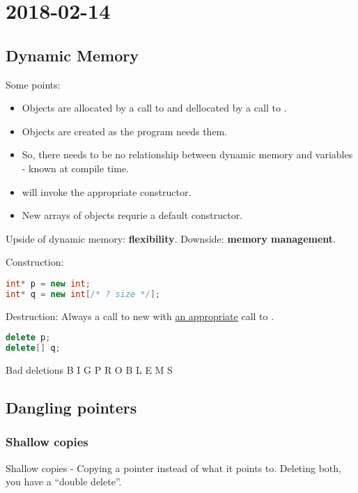 \section{2018-02-14}

\subsection{Dynamic Memory}

Some points:

\begin{itemize}
  \item Objects are allocated by a call to  and dellocated by a call to .
  \item Objects are created as the program needs them.
  \item So, there needs to be no relationship between dynamic memory and variables - known at compile time.
  \item {} will invoke the appropriate constructor.
  \item New arrays of objects requrie a default constructor.
\end{itemize}

Upside of dynamic memory: \textbf{flexibility}. Downside: \textbf{memory management}.

Construction:

\begin{lstlisting}[language=C++]
int* p = new int;
int* q = new int[/* ? size */];
\end{lstlisting}

Destruction: Always a call to new with \underline{an appropriate} call to .

\begin{lstlisting}[language=C++]
delete p;
delete[] q;
\end{lstlisting}

Bad deletions \textrightarrow B I G   P R O B L E M S

\subsection{Dangling pointers}

\subsubsection{Shallow copies}

Shallow copies - Copying a pointer instead of what it points to. Deleting both, you have a ``double delete''.

